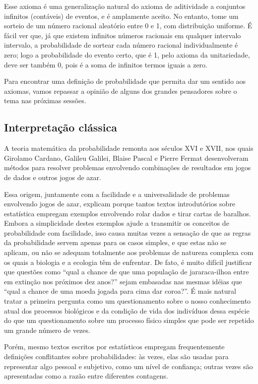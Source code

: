 Esse axioma é uma generalização natural do axioma de aditividade a conjuntos infinitos (contáveis) de eventos, e é amplamente
aceito. No entanto, tome um sorteio de um número racional aleatório entre 0 e 1, com distribuição uniforme. É fácil ver que,
já que existem infinitos números racionais em qualquer intervalo intervalo,
a probabilidade de sortear cada número racional individualmente é zero; logo a probabilidade do evento certo, que é 1, 
pelo axioma da unitariedade, deve ser também 0, pois é a soma de infinitos termos iguais a zero.

Para encontrar uma definição de probabilidade que permita dar um sentido aos axiomas, vamos repassar a opinião de alguns dos 
grandes pensadores sobre o tema nas próximas sessões.

\subsection{Interpretação clássica}
A teoria matemática da probabilidade remonta aos séculos XVI e XVII, nos quais Girolamo Cardano, Galileu Galilei, Blaise Pascal
e Pierre Fermat desenvolveram métodos para resolver problemas envolvendo combinações de resultados em jogos de dados e outros
jogos de azar. 

Essa origem, juntamente com a facilidade e a universalidade de problemas envolvendo jogos de azar, explicam porque tantos textos
introdutórios sobre estatística empregam exemplos envolvendo rolar dados e tirar cartas de baralhos. Embora a simplicidade
destes exemplos ajude a transmitir os conceitos de probabilidade com facilidade, isso causa muitas vezes a sensação de que
as regras da probabilidade servem apenas para os casos simples, e que estas não se aplicam, ou não se adequam totalmente aos 
problemas de natureza complexa com os quais a biologia e a ecologia têm de enfrentar. De fato, é muito difícil justificar que
questões como ``qual a chance de que uma população de jararaca-ilhoa entre em extinção nos próximos dez anos?'' sejam embasadas
nas mesmas idéias que ``qual a chance de uma moeda jogada para cima dar coroa?''. É mais natural tratar a primeira pergunta como
um questionamento sobre o nosso conhecimento atual dos processos biológicos e da condição de vida dos indivíduos dessa espécie
do que um questionamento sobre um processo físico simples que pode ser repetido um grande número de vezes. 

Porém, mesmo textos escritos por estatísticos empregam frequentemente definições conflitantes sobre probabilidades: às vezes,
elas são usadas para representar algo pessoal e subjetivo, como um nível de confiança; outras vezes são apresentadas como a
razão entre diferentes contagens.


